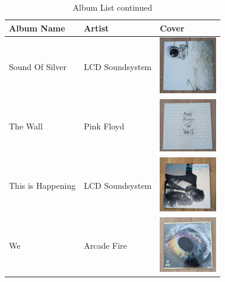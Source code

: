 \begin{table}[h]
    \centering
    \renewcommand{\arraystretch}{1.5} %
    \setlength{\tabcolsep}{10pt}      %
    \begin{tabular}{|m{4cm}|m{4cm}|m{4cm}|} %
        \hline
        \textbf{Album Name} & \textbf{Artist} & \textbf{Cover} \\
        \hline
        Sound Of Silver & LCD Soundsystem & \includegraphics[width=2.5cm]{figures/test_albums/Sound Of Silver.jpg} \\
        \hline
        The Wall & Pink Floyd & \includegraphics[width=2.5cm]{figures/test_albums/The Wall.jpg} \\
        \hline
        This is Happening & LCD Soundsystem & \includegraphics[width=2.5cm]{figures/test_albums/This is Happening.jpg} \\
        \hline
        We & Arcade Fire & \includegraphics[width=2.5cm]{figures/test_albums/We.jpg} \\
        \hline
    \end{tabular}
    \caption{Album List continued}
    \label{tab:albums-list3}
\end{table}

